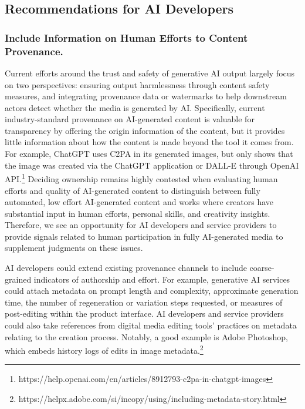 
\subsection{Recommendations for AI Developers}
\subsubsection{Include Information on Human Efforts to Content Provenance.}
Current efforts around the trust and safety of generative AI output largely focus on two perspectives: ensuring output harmlessness through content safety measures, and integrating provenance data or watermarks to help downstream actors detect whether the media is generated by AI. Specifically, current industry-standard provenance on AI-generated content is valuable for transparency by offering the origin information of the content, but it provides little information about how the content is made beyond the tool it comes from. For example, ChatGPT uses C2PA in its generated images, but only shows that the image was created via the ChatGPT application or DALL-E through OpenAI API.\footnote{https://help.openai.com/en/articles/8912793-c2pa-in-chatgpt-images} Deciding ownership remains highly contested when evaluating human efforts and quality of AI-generated content to distinguish between fully automated, low effort AI-generated content and works where creators have substantial input in human efforts, personal skills, and creativity insights. Therefore, we see an opportunity for AI developers and service providers to provide signals related to human participation in fully AI-generated media to supplement judgments on these issues.

AI developers could extend existing provenance channels to include coarse-grained indicators of authorship and effort. For example, generative AI services could attach metadata on prompt length and complexity, approximate generation time, the number of regeneration or variation steps requested, or measures of post-editing within the product interface. AI developers and service providers could also take references from digital media editing tools' practices on metadata relating to the creation process. Notably, a good example is Adobe Photoshop, which embeds history logs of edits in image metadata.\footnote{https://helpx.adobe.com/si/incopy/using/including-metadata-story.html}  


